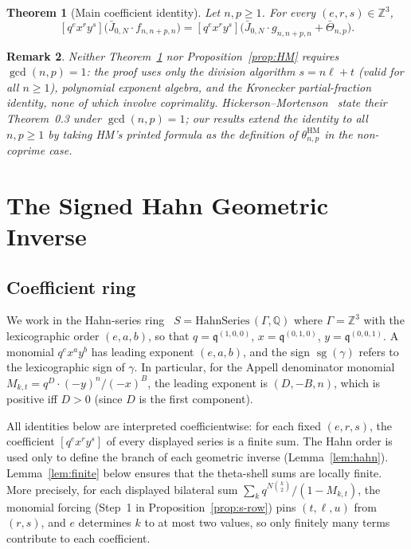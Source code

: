 \documentclass[11pt]{article}
\newtheorem{theorem}{Theorem}[section]
\newtheorem{remark}[theorem]{Remark}
\newcommand{\Z}{\mathbb{Z}}
\newcommand{\Q}{\mathbb{Q}}
\newcommand{\sg}{\operatorname{sg}}
\begin{document}
\begin{theorem}[Main coefficient identity]\label{thm:main}
Let $n,p\ge 1$.  For every $(e,r,s)\in\Z^3$,
\[
  [q^e x^r y^s]\bigl(\bar{J}_{0,N}\cdot f_{n,n+p,n}\bigr)
  =
  [q^e x^r y^s]\bigl(\bar{J}_{0,N}\cdot g_{n,n+p,n}
    +\bar\Theta_{n,p}\bigr).
\]
\end{theorem}

\begin{remark}
Neither Theorem~\ref{thm:main} nor
Proposition~\ref{prop:HM} requires $\gcd(n,p)=1$: the proof
uses only the division algorithm $s=n\ell+t$ (valid for all
$n\ge 1$), polynomial exponent algebra, and the
Kronecker partial-fraction identity, none of which involve
coprimality.  Hickerson--Mortenson~\cite{jHiMo14} state their
Theorem~0.3 under $\gcd(n,p)=1$; our results extend the identity
to all $n,p\ge 1$ by taking HM's printed formula as the
definition of $\theta_{n,p}^{\mathrm{HM}}$ in the non-coprime
case.
\end{remark}

\section{The Signed Hahn Geometric Inverse}\label{sec:hahn}

\subsection{Coefficient ring}
We work in the Hahn-series ring~\cite{oHa07}
$S=\mathrm{HahnSeries}\,(\Gamma,\Q)$
where $\Gamma=\Z^3$ with the lexicographic order $(e,a,b)$, so that
$q=\mathfrak{q}^{(1,0,0)}$, $x=\mathfrak{q}^{(0,1,0)}$,
$y=\mathfrak{q}^{(0,0,1)}$.  A monomial $q^e x^a y^b$ has leading
exponent $(e,a,b)$, and the sign $\sg(\gamma)$ refers to the
lexicographic sign of $\gamma$.  In particular, for the Appell
denominator monomial $M_{k,t}=q^D\cdot(-y)^n/(-x)^B$, the leading
exponent is $(D,-B,n)$, which is positive iff $D>0$
(since $D$ is the first component).

All identities below are interpreted coefficientwise: for each
fixed $(e,r,s)$, the coefficient $[q^e x^r y^s]$ of every displayed
series is a finite sum.  The Hahn order is used only to define
the branch of each geometric inverse (Lemma~\ref{lem:hahn}).
Lemma~\ref{lem:finite} below ensures that the theta-shell sums
are locally finite.  More precisely, for each displayed bilateral
sum $\sum_k q^{N\binom{k}{2}}/(1-M_{k,t})$, the monomial
forcing (Step~1 in Proposition~\ref{prop:s-row}) pins
$(t,\ell,u)$ from $(r,s)$, and $e$ determines $k$ to at most
two values, so only finitely many terms contribute to each
coefficient.
\end{document}
